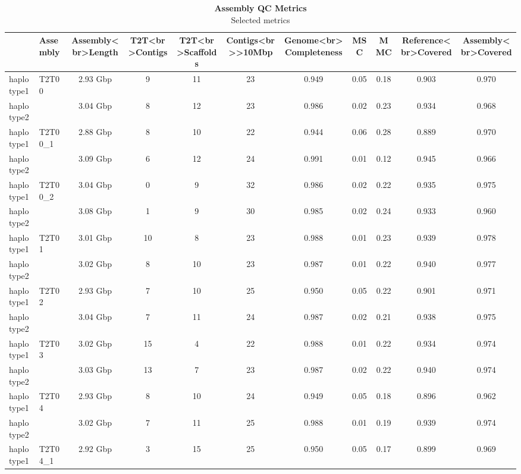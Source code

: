 \begin{table}[t]
\caption*{
{\fontsize{15}{19}\selectfont  \textbf{Assembly QC Metrics}\fontsize{12}{15}\selectfont } \\ 
{\fontsize{11}{14}\selectfont  Selected metrics\fontsize{12}{15}\selectfont }
} 
\fontsize{12.0pt}{14.0pt}\selectfont
\begin{tabular*}{0.9\linewidth}{@{\extracolsep{\fill}}l|lccccccccc}
\toprule
 & Assembly & Assembly<br>Length & T2T<br>Contigs & T2T<br>Scaffolds & Contigs<br>>10Mbp & Genome<br>Completeness & MSC & MMC & Reference<br>Covered & Assembly<br>Covered \\ 
\midrule\addlinespace[2.5pt]
haplotype1 & {T2T00} & {2.93 Gbp} & {9} & {11} & {23} & {0.949} & {0.05} & {0.18} & {0.903} & {0.970} \\ 
haplotype2 &  & 3.04 Gbp & 8 & 12 & 23 & 0.986 & 0.02 & 0.23 & 0.934 & 0.968 \\ 
haplotype1 & {T2T00\_1} & {2.88 Gbp} & {8} & {10} & {22} & {0.944} & {0.06} & {0.28} & {0.889} & {0.970} \\ 
haplotype2 &  & 3.09 Gbp & 6 & 12 & 24 & 0.991 & 0.01 & 0.12 & 0.945 & 0.966 \\ 
haplotype1 & {T2T00\_2} & {3.04 Gbp} & {0} & {9} & {32} & {0.986} & {0.02} & {0.22} & {0.935} & {0.975} \\ 
haplotype2 &  & 3.08 Gbp & 1 & 9 & 30 & 0.985 & 0.02 & 0.24 & 0.933 & 0.960 \\ 
haplotype1 & {T2T01} & {3.01 Gbp} & {10} & {8} & {23} & {0.988} & {0.01} & {0.23} & {0.939} & {0.978} \\ 
haplotype2 &  & 3.02 Gbp & 8 & 10 & 23 & 0.987 & 0.01 & 0.22 & 0.940 & 0.977 \\ 
haplotype1 & {T2T02} & {2.93 Gbp} & {7} & {10} & {25} & {0.950} & {0.05} & {0.22} & {0.901} & {0.971} \\ 
haplotype2 &  & 3.04 Gbp & 7 & 11 & 24 & 0.987 & 0.02 & 0.21 & 0.938 & 0.975 \\ 
haplotype1 & {T2T03} & {3.02 Gbp} & {15} & {4} & {22} & {0.988} & {0.01} & {0.22} & {0.934} & {0.974} \\ 
haplotype2 &  & 3.03 Gbp & 13 & 7 & 23 & 0.987 & 0.02 & 0.22 & 0.940 & 0.974 \\ 
haplotype1 & {T2T04} & {2.93 Gbp} & {8} & {10} & {24} & {0.949} & {0.05} & {0.18} & {0.896} & {0.962} \\ 
haplotype2 &  & 3.02 Gbp & 7 & 11 & 25 & 0.988 & 0.01 & 0.19 & 0.939 & 0.974 \\ 
haplotype1 & {T2T04\_1} & {2.92 Gbp} & {3} & {15} & {25} & {0.950} & {0.05} & {0.17} & {0.899} & {0.969} \\ 

\end{tabular*}
\end{table}
